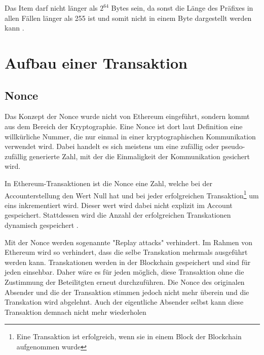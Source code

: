 \documentclass[runningheads]{llncs}
\begin{document}
Das Item darf nicht länger als $2^{64}$ Bytes sein, da sonst die Länge des Präfixes in allen Fällen länger als 255 ist und somit nicht in einem Byte dargestellt werden kann \cite[S.18,19]{wood_ethereum/yellowpaper_2019}.
\section{Aufbau einer Transaktion}

\subsection{Nonce}
\label{nonce}
Das Konzept der Nonce wurde nicht von Ethereum eingeführt, sondern kommt aus dem Bereich der Kryptographie. Eine Nonce ist dort laut Definition \cite{noauthor_ethereum/wiki/rlp_nodate}
eine willkürliche Nummer, die nur einmal in einer kryptographischen Kommunikation verwendet wird. Dabei handelt es sich meistens um eine zufällig oder pseudo-zufällig generierte Zahl, mit der die Einmaligkeit der Kommunikation gesichert wird.

In Ethereum-Transaktionen ist die Nonce eine Zahl, welche bei der Accounterstellung den Wert Null hat und bei jeder erfolgreichen Transaktion\footnote{Eine Transaktion ist erfolgreich, wenn sie in einem Block der Blockchain aufgenommen wurde} um eins inkrementiert wird. Dieser wert wird dabei nicht explizit im Account gespeichert. Stattdessen wird die Anzahl der erfolgreichen Transkationen dynamisch gespeichert \cite[S.101]{antonopoulos_mastering_2019}.

Mit der Nonce werden sogenannte "Replay attacks" verhindert. Im Rahmen von Ethereum wird so verhindert, dass die selbe Transkation mehrmals ausgeführt werden kann. Transkationen werden in der Blockchain gespeichert und sind für jeden einsehbar. Daher wäre es für jeden möglich, diese Transaktion ohne die Zustimmung der Beteilitgten erneut durchzuführen. Die Nonce des originalen Absender und die der Transaktion stimmen jedoch nicht mehr überein und die Transkation wird abgelehnt. Auch der eigentliche Absender selbst kann diese Transaktion demnach nicht mehr wiederholen
\end{document}
